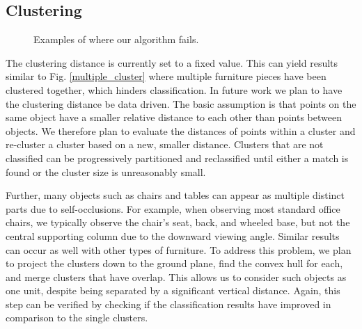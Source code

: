 \documentclass[letterpaper, 10pt, conference]{ieeeconf}
\begin{document}
\vspace{-5pt}
\subsection{Clustering}
\label{clustering}

\begin{figure}[t]
\centering
   \hfil
\caption{Examples of where our algorithm fails.}
\label{partial_models}
\vspace{-15pt}
\end{figure}


The clustering distance is currently set to a fixed value. This can yield results similar to Fig. \ref{multiple_cluster} where multiple furniture pieces have been clustered together, which hinders classification. In future work we plan to have the clustering distance be data driven. The basic assumption is that points on the same object have a smaller relative distance to each other than points between objects. We therefore plan to evaluate the distances of points within a cluster and re-cluster a cluster based on a new, smaller distance. Clusters that are not classified can be progressively partitioned and reclassified until either a match is found or the cluster size is unreasonably small.

Further, many objects such as chairs and tables can appear as multiple distinct parts due to self-occlusions.  For example, when observing most standard office chairs, we typically observe the chair's seat, back, and wheeled base, but not the central supporting column due to the downward viewing angle. Similar results can occur as well with other types of furniture.  To address this problem, we plan to project the clusters down to the ground plane, find the convex hull for each, and merge clusters that have overlap.  This allows us to consider such objects as one unit, despite being separated by a significant vertical distance. Again, this step can be verified by checking if the classification results have improved in comparison to the single clusters.
\end{document}
